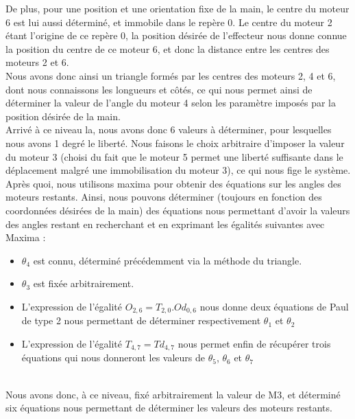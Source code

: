 De plus, pour une position et une orientation fixe de la main, le centre du moteur 6 est lui aussi déterminé, et immobile dans le repère 0. Le centre du moteur 2 étant l'origine de ce repère 0, la position désirée de l'effecteur nous donne connue la position du centre de ce moteur 6, et donc la distance entre les centres des moteurs 2 et 6.\\

Nous avons donc ainsi un triangle formés par les centres des moteurs 2, 4 et 6, dont nous connaissons les longueurs et côtés, ce qui nous permet ainsi de déterminer la valeur de l'angle du moteur 4 selon les paramètre imposés par la position désirée de la main.\\

Arrivé à ce niveau la, nous avons donc 6 valeurs à déterminer, pour lesquelles nous avons 1 degré le liberté. Nous faisons le choix arbitraire d'imposer la valeur du moteur 3 (choisi du fait que le moteur 5 permet une liberté suffisante dans le déplacement malgré une immobilisation du moteur 3), ce qui nous fige le système.\\

Après quoi, nous utilisons maxima pour obtenir des équations sur les angles des moteurs restants. Ainsi, nous pouvons déterminer (toujours en fonction des coordonnées désirées de la main) des équations nous permettant d'avoir la valeurs des angles restant en recherchant et en exprimant les égalités suivantes avec Maxima :\\

\begin{itemize}
\item $\theta_4$ est connu, déterminé précédemment via la méthode du triangle.
\item $\theta_3$ est fixée arbitrairement.
\item L'expression de l'égalité $O_{2, 6} = T_{2, 0} . Od_{0, 6}$ nous donne deux équations de Paul de type 2 nous permettant de déterminer respectivement $\theta_1$ et  $\theta_2$
\item L'expression de l'égalité $T_{4, 7} = Td_{4, 7}$ nous permet enfin de récupérer trois équations qui nous donneront les valeurs de $\theta_5$, $\theta_6$ et $\theta_7$
\end{itemize}\\

Nous avons donc, à ce niveau, fixé arbitrairement la valeur de M3, et déterminé six équations nous permettant de déterminer les valeurs des moteurs restants.



